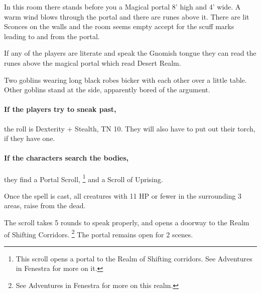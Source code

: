 \begin{multicols}{2}
\begin{boxtext}
	In this room there stands before you a Magical portal 8' high and 4' wide.
	A warm wind blows through the portal and there are runes above it.
	There are lit Sconces on the walls and the room seems empty accept for the scuff marks leading to and from the portal. 

\end{boxtext}

If any of the players are literate and speak the Gnomish tongue they can read the runes above the magical portal which read Desert Realm.


\begin{boxtext}

	Two goblins wearing long black robes bicker with each other over a little table.
	Other goblins stand at the side, apparently bored of the argument.

\end{boxtext}

\paragraph{If the players try to sneak past,}
the roll is Dexterity + Stealth, TN 10.
They will also have to put out their torch, if they have one.

\paragraph{If the characters search the bodies,}
they find a Portal Scroll,%
\footnote{This scroll opens a portal to the Realm of Shifting corridors. See Adventures in Fenestra for more on it.}%
 and a Scroll of Uprising.


Once the spell is cast, all creatures with 11 HP or fewer in the surrounding 3 areas, raise from the dead.


The scroll takes 5 rounds to speak properly, and opens a doorway to the Realm of Shifting Corridors.%
\footnote{See Adventures in Fenestra for more on this realm.}
The portal remains open for 2 scenes.





\end{multicols}
